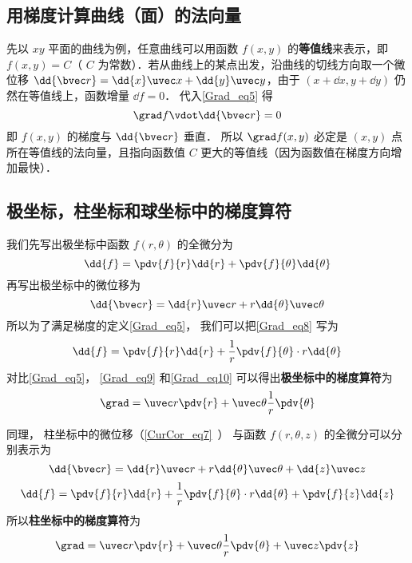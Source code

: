 \subsection{用梯度计算曲线（面）的法向量}
先以 $xy$ 平面的曲线为例，任意曲线可以用函数 $f(x,y)$ 的\textbf{等值线}来表示，即 $f(x,y) = C$（ $C$ 为常数）．若从曲线上的某点出发，沿曲线的切线方向取一个微位移 $\dd{\bvec r} = \dd{x}\uvec x + \dd{y} \uvec y$，由于 $(x+\dd{x}, y+\dd{y})$ 仍然在等值线上，函数增量 $\dd{f} = 0$． 代入\autoref{Grad_eq5} 得
\begin{equation}
\grad f \vdot \dd{\bvec r} = 0
\end{equation}
即 $f(x,y)$ 的梯度与 $\dd{\bvec r}$ 垂直． 所以 $\grad f(x,y)$ 必定是 $(x,y)$ 点所在等值线的法向量，且指向函数值 $C$ 更大的等值线（因为函数值在梯度方向增加最快）．

\subsection{极坐标，柱坐标和球坐标中的梯度算符}

我们先写出极坐标中函数 $f(r,\theta)$ 的全微分为
\begin{equation}\label{Grad_eq8}
\dd{f} = \pdv{f}{r} \dd{r} + \pdv{f}{\theta} \dd{\theta}
\end{equation}
再写出极坐标中的微位移为
\begin{equation}\label{Grad_eq9}
\dd{\bvec r} = \dd{r} \uvec r + r \dd{\theta} \uvec \theta
\end{equation}
所以为了满足梯度的定义\autoref{Grad_eq5}， 我们可以把\autoref{Grad_eq8} 写为
\begin{equation}\label{Grad_eq10}
\dd{f} = \pdv{f}{r} \dd{r} + \frac1r \pdv{f}{\theta} \cdot r\dd{\theta}
\end{equation}
对比\autoref{Grad_eq5}， \autoref{Grad_eq9} 和\autoref{Grad_eq10} 可以得出\textbf{极坐标中的梯度算符}为
\begin{equation}
\grad = \uvec r \pdv{r} + \uvec \theta \frac1r \pdv{\theta}
\end{equation}

同理， 柱坐标中的微位移（\autoref{CurCor_eq7}~） 与函数 $f(r,\theta, z)$ 的全微分可以分别表示为
\begin{equation}
\dd{\bvec r} = \dd{r} \uvec r + r\dd{\theta} \uvec \theta + \dd{z} \uvec z
\end{equation}
\begin{equation}
\dd{f} = \pdv{f}{r} \dd{r} + \frac1r \pdv{f}{\theta} \cdot  r\dd{\theta} + \pdv{f}{z} \dd{z}
\end{equation}
所以\textbf{柱坐标中的梯度算符}为
\begin{equation}
\grad = \uvec r \pdv{r} + \uvec \theta \frac1r \pdv{\theta} + \uvec z \pdv{z}
\end{equation}

